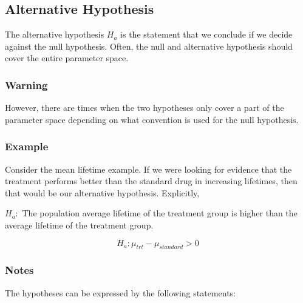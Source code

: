 \documentclass[
  letterpaper,
  DIV=11,
  numbers=noendperiod]{scrartcl}
\begin{document}
\subsection{Alternative Hypothesis}\label{alternative-hypothesis}

The alternative hypothesis \(H_a\) is the statement that we conclude if
we decide against the null hypothesis. Often, the null and alternative
hypothesis should cover the entire parameter space.

\subsubsection{Warning}

\begin{tcolorbox}[enhanced jigsaw, bottomtitle=1mm, colback=white, opacityback=0, leftrule=.75mm, opacitybacktitle=0.6, coltitle=black, left=2mm, colframe=quarto-callout-warning-color-frame, toptitle=1mm, colbacktitle=quarto-callout-warning-color!10!white, titlerule=0mm, title=\textcolor{quarto-callout-warning-color}{\faExclamationTriangle}\hspace{0.5em}{Warning}, arc=.35mm, rightrule=.15mm, breakable, bottomrule=.15mm, toprule=.15mm]

However, there are times when the two hypotheses only cover a part of
the parameter space depending on what convention is used for the null
hypothesis.

\end{tcolorbox}

\subsubsection{Example}

Consider the mean lifetime example. If we were looking for evidence that
the treatment performs better than the standard drug in increasing
lifetimes, then that would be our alternative hypothesis. Explicitly,

\(H_a:\) The population average lifetime of the treatment group is
higher than the average lifetime of the treatment group.

\[
H_a: \mu_{trt} -\mu_{standard} >0
\]

\subsubsection{Notes}

The hypotheses can be expressed by the following statements:
\end{document}

